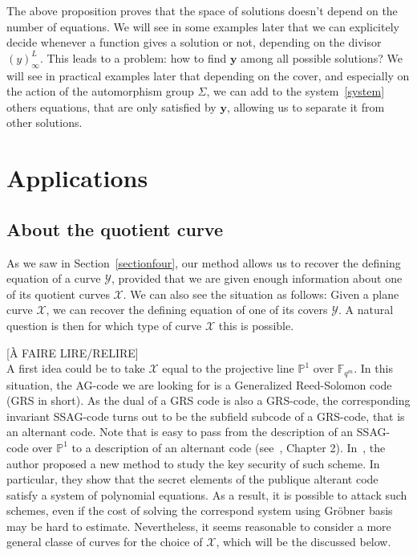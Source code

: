 \documentclass[10pt]{article}
\theoremstyle{definition}
\theoremstyle{definition}
\theoremstyle{definition}
\newcommand{\s}{\vspace{0.3cm}}
\newcommand{\PP}{\mathbb{P}}
\newcommand{\fqm}{\mathbb{F}_{q^m}}
\newcommand{\X}{\mathcal{X}}
\newcommand{\Y}{\mathcal{Y}}
\begin{document}
\s

The above proposition proves that the space of solutions doesn't depend on the number of equations. 
We will see in some examples later that we can explicitely decide whenever a function gives a solution or not, depending on the divisor $(y)^L_{\infty}$. This leads to a problem: how to find $\mathbf{y}$ among all possible solutions? We will see in practical examples later that depending on the cover, and especially on the action of the automorphism group $\Sigma$,  we can add to the system~\eqref{system} others equations, that are only satisfied by $\mathbf{y}$, allowing us to separate it from other solutions.

\s
\section{Applications}

\s

\subsection{About the quotient curve}

\s


As we saw in Section~\ref{sectionfour}, our method allows us to recover the defining equation of a curve $\Y$, provided that we are given enough information about one of its quotient curves $\X$. We can also see the situation as follows: Given a plane curve $\X$, we can recover the defining equation of one of its covers $\Y$. A natural question is then for which type of curve $\X$ this is possible. 

\s

\color{blue} [À FAIRE LIRE/RELIRE] \\
A first idea could be to take $\X$ equal to the projective line $\PP^1$ over $\fqm$. In this situation, the AG-code we are looking for is a Generalized Reed-Solomon code (GRS in short). As the dual of a GRS code is also a GRS-code, the corresponding invariant SSAG-code turns out to be the subfield subcode of a  GRS-code, that is an alternant code. Note that is easy to pass from the description of an SSAG-code over $\PP^1$ to a description of an alternant code (see~\cite{Sti}, Chapter 2). In~\cite{FOP2}, the author proposed a new method to study the key security of such scheme. In particular, they show that the secret elements of the publique alterant code satisfy a system of polynomial equations. As a result, it is possible to attack such schemes, even if the cost of solving the correspond system using Gröbner basis may be hard to estimate. Nevertheless, it seems reasonable to consider a more general classe of curves for the choice of $\mathcal{X}$, which will be the discussed below.
\color{black}
\end{document}
